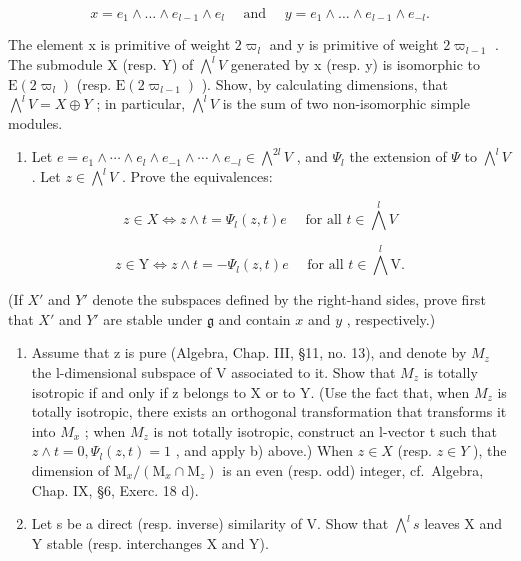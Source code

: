 \[
x = e _ {1} \wedge \dots \wedge e _ {l - 1} \wedge e _ {l} \quad \text { and } \quad y = e _ {1} \wedge \dots \wedge e _ {l - 1} \wedge e _ {- l}.
\]

The element x is primitive of weight \(2\varpi_{l}\) and y is primitive of weight \(2\varpi_{l-1}\) . The submodule X (resp. Y) of \(\bigwedge^{l}V\) generated by x (resp. y) is isomorphic to \(\mathrm{E}(2\varpi_{l})\) (resp. \(\mathrm{E}(2\varpi_{l-1})\) ). Show, by calculating dimensions, that \(\bigwedge^{l}V = X \oplus Y\) ; in particular, \(\bigwedge^{l}V\) is the sum of two non-isomorphic simple modules.

\begin{enumerate}
\def\labelenumi{\alph{enumi})}
\setcounter{enumi}{1}
\tightlist
\item
  Let \(e = e_{1} \wedge \cdots \wedge e_{l} \wedge e_{-1} \wedge \cdots \wedge e_{-l} \in \bigwedge^{2l}V\) , and \(\varPsi_{l}\) the extension of \(\varPsi\) to \(\bigwedge^{l}V\) . Let \(z \in \bigwedge^{l}V\) . Prove the equivalences:
\end{enumerate}

\[
z \in X \Longleftrightarrow z \wedge t = \Psi_ {l} (z, t) e \quad \text {   for   all   } t \in \bigwedge^ {l} V
\]

\[
z \in \mathrm{Y} \Longleftrightarrow z \wedge t = - \Psi_ {l} (z, t) e \quad \text {   for   all   } t \in \bigwedge^ {l} \mathrm{V}.
\]

(If \(X'\) and \(Y'\) denote the subspaces defined by the right-hand sides, prove first that \(X'\) and \(Y'\) are stable under \(\mathfrak{g}\) and contain \(x\) and \(y\) , respectively.)

\begin{enumerate}
\def\labelenumi{\alph{enumi})}
\setcounter{enumi}{2}
\item
  Assume that z is pure (Algebra, Chap. III, §11, no. 13), and denote by \(M_{z}\) the l-dimensional subspace of V associated to it. Show that \(M_{z}\) is totally isotropic if and only if z belongs to X or to Y. (Use the fact that, when \(M_{z}\) is totally isotropic, there exists an orthogonal transformation that transforms it into \(M_{x}\) ; when \(M_{z}\) is not totally isotropic, construct an l-vector t such that \(z \wedge t = 0, \Psi_{l}(z, t) = 1\) , and apply b) above.) When \(z \in X\) (resp. \(z \in Y\) ), the dimension of \(\mathrm{M}_{x}/(\mathrm{M}_{x} \cap \mathrm{M}_{z})\) is an even (resp. odd) integer, cf.~Algebra, Chap. IX, §6, Exerc. 18 d).
\item
  Let s be a direct (resp. inverse) similarity of V. Show that \(\bigwedge^{l}s\) leaves X and Y stable (resp. interchanges X and Y).
\end{enumerate}

